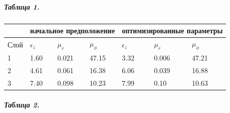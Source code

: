 \documentclass[a4paper, 12pt]{article}
\begin{document}
\subparagraph*{Таблица 1.}

\begin{table}[h]
\begin{tabular}{lllllll}
\hline
\multicolumn{1}{|l}{}     & \multicolumn{3}{|l}{начальное предположение}                                                       & \multicolumn{3}{|l|}{оптимизированные параметры}                                                    \\ \hline
\multicolumn{1}{|l}{Слой} & \multicolumn{1}{|l}{$\epsilon_z$} & \multicolumn{1}{|l}{$\mu_r$} & \multicolumn{1}{|l}{$\mu_\phi$} & \multicolumn{1}{|l}{$\epsilon_z$} & \multicolumn{1}{|l}{$\mu_r$} & \multicolumn{1}{|l|}{$\mu_\phi$} \\ \hline
\multicolumn{1}{|l}{1}    & \multicolumn{1}{|l}{1.60}         & \multicolumn{1}{|l}{0.021}   & \multicolumn{1}{|l}{47.15}      & \multicolumn{1}{|l}{3.32}         & \multicolumn{1}{|l}{0.006}   & \multicolumn{1}{|l|}{47.21}      \\ \hline
\multicolumn{1}{|l}{2}    & \multicolumn{1}{|l}{4.61}         & \multicolumn{1}{|l}{0.061}   & \multicolumn{1}{|l}{16.38}      & \multicolumn{1}{|l}{6.06}         & \multicolumn{1}{|l}{0.039}   & \multicolumn{1}{|l|}{16.88}      \\ \hline
\multicolumn{1}{|l}{3}    & \multicolumn{1}{|l}{7.40}         & \multicolumn{1}{|l}{0.098}   & \multicolumn{1}{|l}{10.23}      & \multicolumn{1}{|l}{7.99}         & \multicolumn{1}{|l}{0.10}    & \multicolumn{1}{|l|}{10.63}      \\ \hline                                 
\end{tabular}
\end{table}

\subparagraph*{Таблица 2.}
\end{document}
